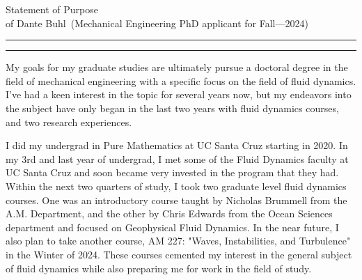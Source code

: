 \documentclass{article}
\newcommand{\soptitle}{Statement of Purpose}
\newcommand{\yourname}{Dante Buhl}
\begin{document}
\begin{center}\LARGE\soptitle\\
\large of \yourname\ (Mechanical Engineering PhD applicant for Fall---2024)
\end{center}

\hrule
\vspace{1pt}
\hrule height 1pt

\bigskip

\large
My goals for my graduate studies are ultimately pursue a doctoral degree in the field of mechanical engineering with a specific focus on the field of fluid dynamics. I've had a keen interest in the topic for several years now, but my endeavors into the subject have only began in the last two years with fluid dynamics courses, and two research experiences. 

I did my undergrad in Pure Mathematics at UC Santa Cruz starting in 2020. In my 3rd and last year of undergrad, I met some of the Fluid Dynamics faculty at UC Santa Cruz and soon became very invested in the program that they had. Within the next two quarters of study, I took two graduate level fluid dynamics courses. One was an introductory course taught by Nicholas Brummell from the A.M. Department, and the other by Chris Edwards from the Ocean Sciences department and focused on Geophysical Fluid Dynamics. In the near future, I also plan to take another course, AM 227: "Waves, Instabilities, and Turbulence" in the Winter of 2024. These courses cemented my interest in the general subject of fluid dynamics while also preparing me for work in the field of study. 
\end{document}
